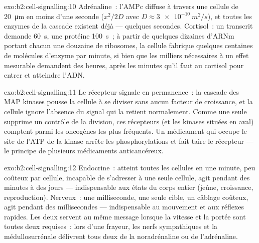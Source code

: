 \begin{solution}{exo:b2:cell-signalling:10}
Adrénaline~: l'AMPc diffuse à travers une cellule de \qty{20}{\micro m}
en moins d'une seconde ($x^{2}/2D$ avec $D \approx \qty{3e-10}{m^2/s}$),
et toutes les enzymes de la cascade existent déjà --- quelques secondes.
Cortisol~: un transcrit demande \qty{60}{s}, une protéine \qty{100}{s}~;
à partir de quelques dizaines d'ARNm portant chacun une douzaine de
ribosomes, la cellule fabrique quelques centaines de molécules d'enzyme
par minute, si bien que les milliers nécessaires à un effet mesurable
demandent des heures, après les minutes qu'il faut au cortisol pour
entrer et atteindre l'ADN.
\end{solution}

\begin{solution}{exo:b2:cell-signalling:11}
Le récepteur signale en permanence~: la cascade des MAP kinases pousse la
cellule à se diviser sans aucun facteur de croissance, et la cellule
ignore l'absence du signal qui la retient normalement. Comme une seule
 supprime un contrôle de la division, ces récepteurs (et les
kinases situées en aval) comptent parmi les oncogènes les plus
fréquents. Un médicament qui occupe le site de l'ATP de la kinase arrête
les phosphorylations et fait taire le récepteur --- le principe de
plusieurs médicaments anticancéreux.
\end{solution}

\begin{solution}{exo:b2:cell-signalling:12}
Endocrine~: atteint toutes les cellules en une minute, peu coûteux par
cellule, incapable de s'adresser à une seule cellule, agit pendant des
minutes à des jours --- indispensable aux états du corps entier (jeûne,
croissance, reproduction). Nerveux~: une milliseconde, une seule cible,
un câblage coûteux, agit pendant des millisecondes --- indispensable au
mouvement et aux réflexes rapides. Les deux servent au même message
lorsque la vitesse et la portée sont toutes deux requises~: lors d'une
frayeur, les nerfs sympathiques et la médullosurrénale délivrent tous
deux de la noradrénaline ou de l'adrénaline.
\end{solution}

